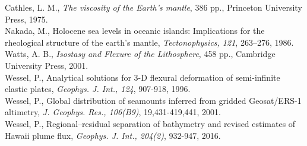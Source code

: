 \documentclass[12pt]{article}
\begin{document}
\noindent
Cathles, L. M., {\it The viscosity of the Earth's mantle}, 386 pp., Princeton University Press, 1975. \\
Nakada, M., Holocene sea levels in oceanic islands: Implications for the rheological structure of the earth's mantle, {\it Tectonophysics, 121}, 263--276, 1986.\\
Watts, A. B., {\it Isostasy and Flexure of the Lithosphere}, 458 pp., Cambridge University Press, 2001.\\
Wessel, P., Analytical solutions for 3-D flexural deformation of semi-infinite elastic plates, {\it Geophys. J. Int., 124}, 907-918, 1996.\\
Wessel, P., Global distribution of seamounts inferred from gridded Geosat/ERS-1 altimetry, {\it J. Geophys. Res., 106(B9)}, 19,431-419,441, 2001.\\
Wessel, P., Regional–residual separation of bathymetry and revised estimates of Hawaii plume flux, {\it Geophys. J. Int., 204(2)}, 932-947, 2016.
\end{document}
